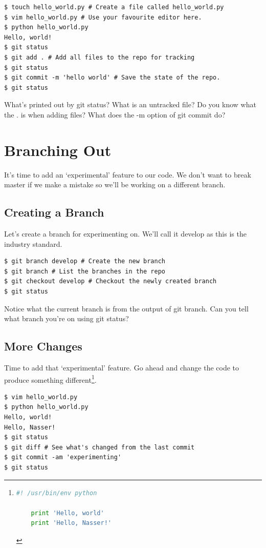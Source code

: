 \documentclass{tufte-handout}
\begin{document}
\begin{lstlisting}
$ touch hello_world.py # Create a file called hello_world.py
$ vim hello_world.py # Use your favourite editor here.
$ python hello_world.py
Hello, world!
$ git status
$ git add . # Add all files to the repo for tracking
$ git status
$ git commit -m 'hello world' # Save the state of the repo.
$ git status
\end{lstlisting}

\noindent What's printed out by git status? What is an untracked file? Do you know what the . is when adding files? What does the -m option of git commit do?

\section{Branching Out}
\noindent It's time to add an `experimental' feature to our code. We don't want to break master if we make a mistake so we'll be working on a different  branch.

\subsection{Creating a Branch}

\noindent Let's create a branch for experimenting on. We'll call it develop as this is the industry standard.

\begin{lstlisting}
$ git branch develop # Create the new branch
$ git branch # List the branches in the repo
$ git checkout develop # Checkout the newly created branch
$ git status
\end{lstlisting}

\noindent Notice what the current branch is from the output of git branch. Can
you tell what branch you're on using git status?

\subsection{More Changes}

\noindent Time to add that `experimental' feature. Go ahead and change the code to produce something different\cprotect\footnote{
	\begin{lstlisting}[language=Python]
	#! /usr/bin/env python

	print 'Hello, world'
	print 'Hello, Nasser!'
	\end{lstlisting}
}.

\begin{lstlisting}
$ vim hello_world.py
$ python hello_world.py
Hello, world!
Hello, Nasser!
$ git status
$ git diff # See what's changed from the last commit
$ git commit -am 'experimenting'
$ git status
\end{lstlisting}
\end{document}
